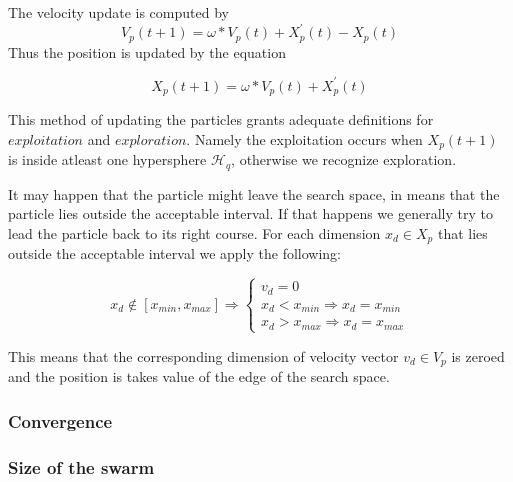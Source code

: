 \documentclass[runningheads,a4paper]{llncs}
\begin{document}
The velocity update is computed by
\begin{equation}
	V_p(t+1) = \omega * V_p(t) + X^{'}_p(t) - X_p(t)
\end{equation}
Thus the position is updated by the equation

\begin{equation}
	X_p(t+1) = \omega * V_p(t) + X^{'}_p(t)
\end{equation}

This method of updating the particles grants adequate definitions for $exploitation$ and $exploration$. Namely the exploitation occurs when $X_p(t+1)$ is inside atleast one hypersphere $\mathcal{H}_q$, otherwise we recognize exploration.


It may happen that the particle might leave the search space, in means that the particle lies outside the acceptable interval. If that happens we generally try to lead the particle back to its right course. For each dimension $x_{d} \in X_p$ that lies  outside the acceptable interval we apply the following:

  \[
	x_{d} \notin [x_{min}, x_{max}] \Rightarrow \left \{
                \begin{array}{ll}
                  v_{d} = 0 \\
                  x_d < x_{min} \Rightarrow x_d = x_{min} \\
                  x_d > x_{max} \Rightarrow x_d = x_{max}
                \end{array}
              \right.
  \]

This means that the corresponding dimension of velocity vector $v_d \in V_p$ is zeroed and the position is takes value of the edge of the search space.
\subsubsection{Convergence}


\subsubsection{Size of the swarm}
\end{document}
